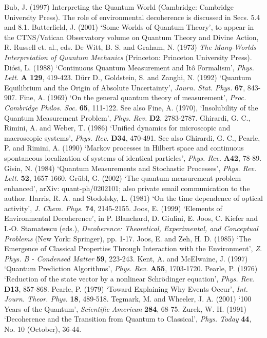 \bigskip
\noindent
Bub, J. (1997) {Interpreting the Quantum World}
(Cambridge: Cambridge University Press).  The role of environmental 
decoherence is discussed in Secs. 5.4 and 8.1.   
\bigskip
\noindent
Butterfield, J. (2001)  `Some Worlds of Quantum Theory', to appear 
in the  CTNS/Vatican Observatory volume on Quantum Theory and Divine 
Action, R. Russell et. al., eds.  
\bigskip
\noindent
De Witt, B. S. and Graham, N. (1973) {\it The Many-Worlds Interpretation of 
Quantum Mechanics}  (Princeton: Princeton University Press).
\bigskip
\noindent
Di\'osi, L. (1988) `Continuous Quantum Measurement and It\^o Formalism',
{\it Phys. Lett.} {\bf A 129}, 419-423.  
\bigskip
\noindent
D\"urr D., Goldstein, S. and Zanghi, N. (1992) `Quantum Equilibrium and the 
Origin of Absolute Uncertainty',  {\it Journ. Stat. Phys.} {\bf 67}, 843-907.
\bigskip
\noindent
Fine, A. (1969) `On the general quantum theory of measurement',  
{\it Proc. Cambridge Philos. Soc.} 
{\bf  65}, 111-122.    See also Fine, A. (1970), `Insolubility of the  
Quantum Measurement Problem', {\it Phys. Rev.} {\bf D2}, 2783-2787.
\bigskip 
\noindent 
Ghirardi, G. C., Rimini, A. and Weber, T. (1986) 
`Unified dynamics for microscopic 
and macroscopic systems', {\it Phys. Rev.} {\bf D34}, 470-491.   See also 
Ghirardi, G. C., Pearle, P. and Rimini, A. (1990) `Markov processes 
in Hilbert space and continuous spontaneous 
localization of systems of identical 
particles', {\it Phys. Rev.} {\bf A42}, 78-89.  
\bigskip
\noindent
Gisin, N. (1984) `Quantum Measurements and Stochastic Processes', 
{\it Phys. Rev. Lett.} {\bf 52}, 1657-1660.
\bigskip
\noindent
Gr\"ubl, G. (2002) `The quantum measurement problem enhanced', arXiv: 
quant-ph/0202101; also private email communication to the author.  
\bigskip
\noindent
Harris, R. A. and Stodolsky, L. (1981) `On the time dependence of optical 
activity', {\it J. Chem. Phys.} {\bf 74}, 2145-2155.
\bigskip
\noindent
Joos, E. (1999) `Elements of Environmental Decoherence', in P. Blanchard, 
D. Giulini, E. Joos, C. Kiefer and I.-O. Stamatescu (eds.), 
{\it Decoherence: Theoretical, Experimental, and Conceptual Problems} 
(New York: Springer), pp. 1-17.
\bigskip
\noindent
Joos, E. and Zeh, H. D. (1985)  `The Emergence of Classical Properties 
Through Interaction with the Environment', {\it Z. Phys. B - Condensed 
Matter} {\bf 59}, 223-243.
\bigskip
\noindent
Kent, A. and McElwaine, J. (1997) `Quantum Prediction Algorithms', 
{\it Phys. Rev.} {\bf A55}, 1703-1720.  
\bigskip
\noindent
Pearle, P. (1976) `Reduction of the state vector by a nonlinear Schr\"odinger  
equation', {\it Phys. Rev.}  {\bf D13},  857-868.    
\bigskip
\noindent       
Pearle, P. (1979) `Toward Explaining Why Events Occur', 
{\it Int. Journ. Theor. Phys.} {\bf 18}, 489-518.   
\bigskip
\noindent
Tegmark, M. and Wheeler, J. A. (2001) `100 Years of the Quantum', 
{\it Scientific American} {\bf 284}, 68-75.  
\bigskip
\noindent
Zurek, W. H. (1991) `Decoherence and the Transition from 
Quantum to Classical', {\it Phys. Today} {\bf 44}, No. 10 (October), 36-44.  
\bigskip
\noindent
\bye
\bigskip
\noindent
\bigskip
\noindent
\bigskip
\noindent
\bigskip
\noindent
\bigskip
\noindent
\bigskip
\noindent
\bigskip
\noindent
\bigskip
\noindent
\bigskip
\noindent
\bigskip
\noindent
\bye

